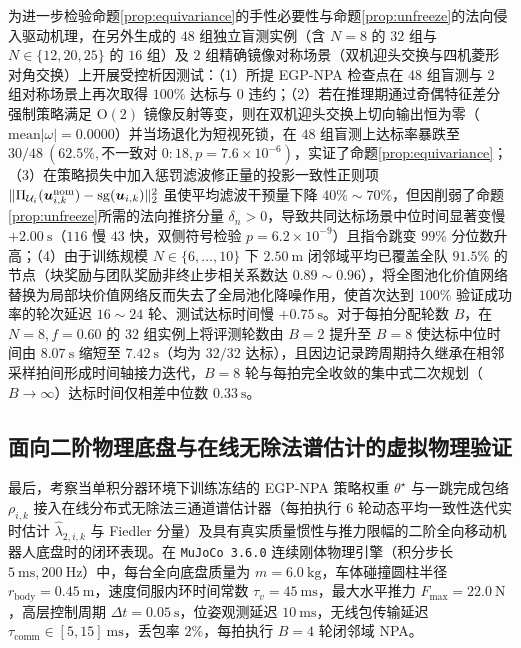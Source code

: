 为进一步检验命题\ref{prop:equivariance}的手性必要性与命题\ref{prop:unfreeze}的法向侵入驱动机理，在另外生成的 $48$ 组独立盲测实例（含 $N=8$ 的 $32$ 组与 $N\in\{12,20,25\}$ 的 $16$ 组）及 $2$ 组精确镜像对称场景（双机迎头交换与四机菱形对角交换）上开展受控析因测试：（1）所提 EGP-NPA 检查点在 $48$ 组盲测与 $2$ 组对称场景上再次取得 $100\%$ 达标与 $0$ 违约；（2）若在推理期通过奇偶特征差分强制策略满足 $\mathrm{O}(2)$ 镜像反射等变，则在双机迎头交换上切向输出恒为零（$\mathrm{mean}|\omega|=0.0000$）并当场退化为短视死锁，在 $48$ 组盲测上达标率暴跌至 $30/48\ (62.5\%,\text{不一致对 }0:18,p=7.6\times 10^{-6})$，实证了命题\ref{prop:equivariance}；（3）在策略损失中加入惩罚滤波修正量的投影一致性正则项 $\lVert\Pi_{\mathcal U_i}(\boldsymbol{u}_{i,k}^{\mathrm{nom}})-\operatorname{sg}(\boldsymbol{u}_{i,k})\rVert_2^2$ 虽使平均滤波干预量下降 $40\%\sim 70\%$，但因削弱了命题\ref{prop:unfreeze}所需的法向推挤分量 $\delta_n>0$，导致共同达标场景中位时间显著变慢 $+2.00\ \mathrm s$（$116$ 慢 $43$ 快，双侧符号检验 $p=6.2\times 10^{-9}$）且指令跳变 $99\%$ 分位数升高；（4）由于训练规模 $N\in\{6,\dots,10\}$ 下 $2.50\ \mathrm m$ 闭邻域平均已覆盖全队 $91.5\%$ 的节点（块奖励与团队奖励非终止步相关系数达 $0.89\sim 0.96$），将全图池化价值网络替换为局部块价值网络反而失去了全局池化降噪作用，使首次达到 $100\%$ 验证成功率的轮次延迟 $16\sim 24$ 轮、测试达标时间慢 $+0.75\ \mathrm s$。对于每拍分配轮数 $B$，在 $N=8,f=0.60$ 的 $32$ 组实例上将评测轮数由 $B=2$ 提升至 $B=8$ 使达标中位时间由 $8.07\ \mathrm s$ 缩短至 $7.42\ \mathrm s$（均为 $32/32$ 达标），且因边记录跨周期持久继承在相邻采样拍间形成时间轴接力迭代，$B=8$ 轮与每拍完全收敛的集中式二次规划（$B\to\infty$）达标时间仅相差中位数 $0.33\ \mathrm s$。

\subsection{面向二阶物理底盘与在线无除法谱估计的虚拟物理验证}\label{subsec:mujoco}
最后，考察当单积分器环境下训练冻结的 EGP-NPA 策略权重 $\theta^\star$ 与一跳完成包络 $\rho_{i,k}$ 接入在线分布式无除法三通道谱估计器（每拍执行 $6$ 轮动态平均一致性迭代实时估计 $\hat\lambda_{2,i,k}$ 与 Fiedler 分量）及具有真实质量惯性与推力限幅的二阶全向移动机器人底盘时的闭环表现。在 \texttt{MuJoCo 3.6.0} 连续刚体物理引擎（积分步长 $5\ \mathrm{ms},200\ \mathrm{Hz}$）中，每台全向底盘质量为 $m=6.0\ \mathrm{kg}$，车体碰撞圆柱半径 $r_{\mathrm{body}}=0.45\ \mathrm m$，速度伺服内环时间常数 $\tau_v=45\ \mathrm{ms}$，最大水平推力 $F_{\max}=22.0\ \mathrm N$，高层控制周期 $\Delta t=0.05\ \mathrm s$，位姿观测延迟 $10\ \mathrm{ms}$，无线包传输延迟 $\tau_{\mathrm{comm}}\in[5,15]\ \mathrm{ms}$，丢包率 $2\%$，每拍执行 $B=4$ 轮闭邻域 NPA。


